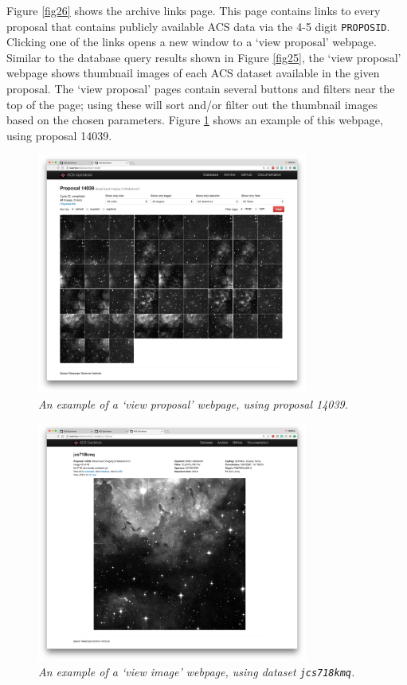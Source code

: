 \documentclass[10pt,journal,compsoc]{IEEEtran}
\begin{document}
Figure \ref{fig26} shows the archive links page.  This page contains links to every proposal that contains publicly available ACS data via the 4-5 digit \texttt{PROPOSID}.  Clicking one
of the links opens a new window to a `view proposal' webpage.  Similar to the database query results shown in Figure \ref{fig25}, the `view proposal' webpage shows
thumbnail images of each ACS dataset available in the given proposal.  The `view proposal' pages contain several buttons and filters near the top of the page; using these will sort and/or
filter out the thumbnail images based on the chosen parameters.  Figure \ref{fig27} shows an example of this webpage, using proposal 14039.

\begin{figure}[!t]
\centering
\includegraphics[width=3.5in]{./figures/view_proposal.png}
\caption{\textit{An example of a `view proposal' webpage, using proposal 14039.}}
\label{fig27}
\end{figure}

\begin{figure}[!t]
\centering
\includegraphics[width=3.5in]{./figures/view_image.png}
\caption{\textit{An example of a `view image' webpage, using dataset \texttt{jcs718kmq}.}}
\label{fig28}
\end{figure}
\end{document}
